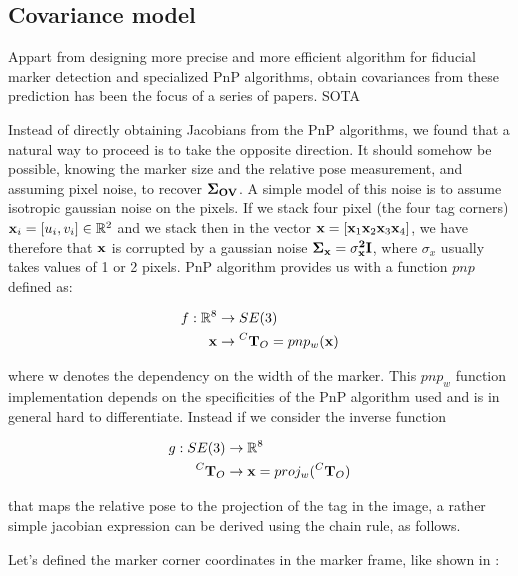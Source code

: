 \subsection{Covariance model}
Appart from designing more precise and more efficient algorithm for fiducial marker detection and specialized PnP algorithms,
 obtain covariances from these prediction has been the focus of a series of papers.
 SOTA

Instead of directly obtaining Jacobians from the PnP algorithms, we found that a natural way to proceed is to take the opposite 
direction. It should somehow be possible, knowing the marker size and the relative pose measurement, and assuming pixel noise, to
recover $\bf \Sigma_{OV}$. A simple model of this noise is to assume isotropic gaussian noise on the pixels. If we stack four pixel (the four tag corners) 
${\bf x}_i = [u_i, v_i] \in \mathbb{R}^2$ and we stack then in the vector ${\bf x} = [{\bf x}_1 {\bf x}_2 {\bf x}_3 {\bf x}_4]$, we have therefore that
${\bf x}$ is corrupted by a gaussian noise $\bf \Sigma_{{\bf x}} = \sigma_{x}^2 {\bf I}$, where $\sigma_{x}$ usually takes values of 1 or 2 pixels.
PnP algorithm provides us with a function $pnp$ defined as:

\begin{equation}
    \begin{split}
        f: \mathbb{R}^8 &\rightarrow SE(3) \\
                           {\bf x} &\rightarrow \prescript{C}{}{{\bf T}}_{O} = pnp_w({\bf x})
    \end{split}
\end{equation}

where w denotes the dependency on the width of the marker. This $pnp_w$ function implementation depends on the specificities of the PnP algorithm used and  
is in general hard to differentiate. Instead if we consider the inverse function

\begin{equation}
    \begin{split}
        g: SE(3) &\rightarrow \mathbb{R}^8 \\
                           \prescript{C}{}{{\bf T}}_{O} &\rightarrow {\bf x} = proj_w(\prescript{C}{}{{\bf T}}_{O})
    \end{split}
\end{equation}

that maps the relative pose to the projection of the tag in the image, a rather simple jacobian expression can be derived using the chain rule, as follows.

Let's defined the marker corner coordinates in the marker frame, like shown in \fig {}:

